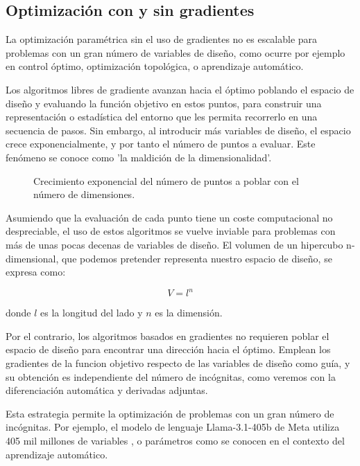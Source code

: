 \subsection{Optimización con y sin gradientes}

La optimización paramétrica sin el uso de gradientes no es escalable para
problemas con un gran número de variables de diseño, como ocurre por ejemplo en
control óptimo, optimización topológica, o aprendizaje automático.

Los algoritmos libres de gradiente avanzan hacia el óptimo poblando el espacio
de diseño y evaluando la función objetivo en estos puntos, para construir una
representación o estadística del entorno que les permita recorrerlo en una
secuencia de pasos. Sin embargo, al introducir más variables de diseño, el
espacio crece exponencialmente, y por tanto el número de puntos a evaluar. Este
fenómeno se conoce como 'la maldición de la dimensionalidad'.

\begin{figure}[h] \centering
	\centering
	
	\caption{Crecimiento exponencial del número de puntos a poblar con el número de dimensiones.}
	\label{fig:hypercube}
\end{figure}

Asumiendo que la evaluación de cada punto tiene un coste computacional no
despreciable, el uso de estos algoritmos se vuelve inviable para problemas con
más de unas pocas decenas de variables de diseño. El volumen de un hipercubo
n-dimensional, que podemos pretender representa nuestro espacio de diseño,
se expresa como:

\begin{equation}
	V = l^n
\end{equation}

donde $l$ es la longitud del lado y $n$ es la dimensión.

Por el contrario, los algoritmos basados en gradientes no requieren poblar el
espacio de diseño para encontrar una dirección hacia el óptimo. Emplean los
gradientes de la funcion objetivo respecto de las variables de diseño como
guía, y su obtención es independiente del número de incógnitas, como veremos
con la diferenciación automática y derivadas adjuntas.

Esta estrategia permite la optimización de problemas con un gran número de
incógnitas. Por ejemplo, el modelo de lenguaje Llama-3.1-405b de Meta utiliza
405 mil millones de variables \cite{dubey2024llama}, o parámetros como se
conocen en el contexto del aprendizaje automático.

